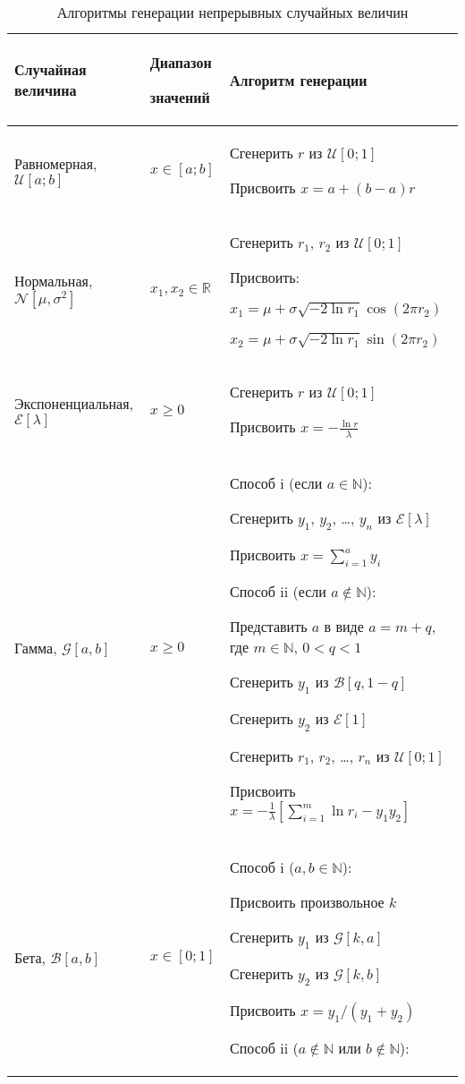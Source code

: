 \begin{table}[h]
\caption{\label{tab:pred} Алгоритмы генерации непрерывных случайных величин}
\begin{tabular}{p{5cm}p{2cm}p{9cm}}
\hline 
\hline
Случайная величина & Диапазон 

значений & Алгоритм генерации \\
\hline
Равномерная, $\mathcal{U}[a;b]$ & $x \in [a;b]$ & Сгенерить $r$ из $\mathcal{U}[0;1]$ 

Присвоить $x=a+(b-a)r$ \\
Нормальная, $\mathcal{N}[\mu,\sigma^2]$ & $ x_1,x_2 \in \mathbb{R}$ &  Сгенерить $r_1$, $r_2$ из $\mathcal{U}[0;1]$ 

Присвоить:

\hspace{0.5cm} $x_1=\mu+\sigma\sqrt{-2\ln r_1}\cos(2\pi r_2)$ 

\hspace{0.5cm} $x_2=\mu+\sigma\sqrt{-2\ln r_1}\sin(2\pi r_2)$ \\ 
Экспоненциальная, $\mathcal{E}[\lambda]$ & $x \geq 0$  & Сгенерить $r$ из $\mathcal{U}[0;1]$ 

Присвоить $x=-\frac{\ln r}{\lambda}$ \\
Гамма, $\mathcal{G}[a,b]$ & $x \geq 0$ & Способ i (если $a \in \mathbb{N}$):

Сгенерить $y_1$, $y_2$, \ldots, $y_n$ из $\mathcal{E}[\lambda]$ 

Присвоить $x=\sum_{i=1}^a y_i$

Способ ii (если $a \notin \mathbb{N}$):

Представить $a$ в виде $a=m+q$, где $m\in \mathbb{N}$, $0<q<1$

Сгенерить $y_1$ из $\mathcal{B}[q,1-q]$

Сгенерить $y_2$ из $\mathcal{E}[1]$

Сгенерить $r_1$, $r_2$, \ldots, $r_n$ из $\mathcal{U}[0;1]$

Присвоить $x=-\frac{1}{\lambda}[\sum_{i=1}^m \ln r_i - y_1y_2]$ \\
Бета, $\mathcal{B}[a,b]$ & $x \in [0;1] $ & Способ i ($a,b \in \mathbb{N}$): 

Присвоить произвольное $k$

Сгенерить $y_1$ из $\mathcal{G}[k,a]$

Сгенерить $y_2$ из $\mathcal{G}[k,b]$

Присвоить $x=y_1/(y_1+y_2)$

Способ ii ($a \notin \mathbb{N}$ или $b \notin \mathbb{N}$): 


\end{tabular}
\end{table}
